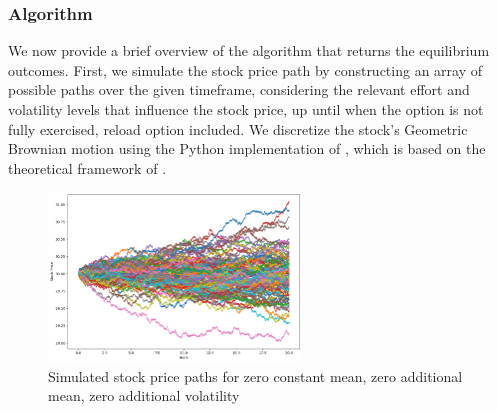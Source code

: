 \subsubsection*{Algorithm}
We now provide a brief overview of the algorithm that returns the equilibrium outcomes. First, we simulate the stock price path by constructing an array of possible paths over the given timeframe, considering the relevant effort and volatility levels that influence the stock price, up until when the option is not fully exercised, reload option included. We discretize the stock's Geometric Brownian motion using the Python implementation of \cite{qsbrownianpy}, which is based on the theoretical framework of \cite{glasserman2004monte}. 
\vspace*{15pt}
\begin{figure}[H]
    \centering
    \includegraphics[width=0.6\textwidth]{fig/5/sim_motion.png}
    \caption{Simulated stock price paths for zero constant mean, zero additional mean, zero additional volatility}
    \label{fig:sim_motion}
\end{figure}
\vspace*{15pt}

